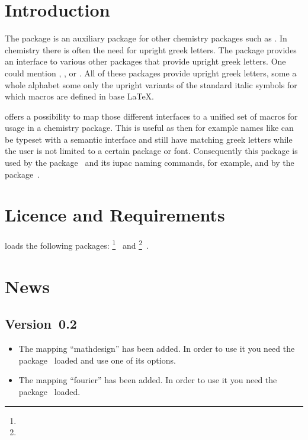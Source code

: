 \documentclass[load-preamble+,scrartcl={listof=totoc}]{cnltx-doc}
\begin{document}

\listoftables

\section{Introduction}
The \chemgreek{} package is an auxiliary package for other chemistry packages
such as .  In chemistry there is often the need for upright
greek letters.  The \chemgreek{} package provides an interface to various
other packages that provide upright greek letters.  One could mention
, ,  or .  All of these
packages provide upright greek letters, some a whole alphabet some only the
upright variants of the standard italic symbols for which macros are defined
in base \LaTeX.

\chemgreek{} offers a possibility to map those different interfaces to a
unified set of macros for usage in a chemistry package.  This is useful as
then for example names like  can be typeset
with a semantic interface and still have matching greek letters while the user
is not limited to a certain package or font.  Consequently this package is
used by the  package~\cite{pkg:chemmacros} and its \acs{iupac}
naming commands, for example, and by the 
package~\cite{pkg:chemnum}.

\section{Licence and Requirements}
\license

\chemgreek{} loads the following packages:
\footnote{}~\cite{bnd:l3kernel} and
\footnote{}~\cite{bnd:l3packages}.

\section{News}
\subsection{Version~0.2}
\begin{itemize}
  \item The mapping ``mathdesign'' has been added.  In order to use it you
    need the  package~\cite{pkg:mathdesign} loaded and use one
    of its options.
  \item The mapping ``fourier'' has been added.  In order to use it you
    need the  package~\cite{pkg:fourier} loaded.
\end{itemize}
\end{document}
